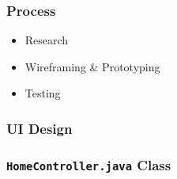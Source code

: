 \documentclass{article}
\begin{document}
\subsubsection{Process}
\begin{itemize}
    \item Research
    \item Wireframing \& Prototyping
    \item Testing
\end{itemize}

\subsubsection{UI Design}

\subsubsection{\texttt{HomeController.java} Class}
\end{document}
